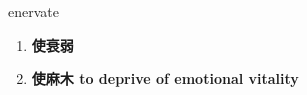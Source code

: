 
\begin{frame}
{\huge enervate}
\begin{center}
\begin{enumerate}\Large
  \item \textbf{使衰弱}
  \item \textbf{使麻木 to deprive of emotional vitality}
\end{enumerate}
\end{center}
\end{frame}

